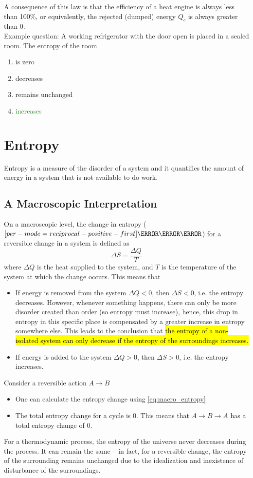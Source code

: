 \documentclass[a4paper,12pt]{article}
\let\oldsection\section
\renewcommand\section{\clearpage\oldsection}
\let\oldsi\si
\renewcommand{\si}[1]{\oldsi[per-mode=reciprocal-positive-first]{#1}}
\newcommand{\lb}{\\[8pt]}
\begin{document}
A consequence of this law is that the efficiency of a heat engine is always less than 100\%, or equivalently, the rejected (dumped) energy $Q_c$ is always greater than 0.\lb
Example question: A working refrigerator with the door open is placed in a sealed room. The entropy of the room
\begin{enumerate}[label=(\Alph*)]
  \item is zero
  \item decreases
  \item remains unchanged
  \item \textcolor{ForestGreen}{increases}
\end{enumerate}

\section{Entropy}

Entropy is a measure of the disorder of a system and it quantifies the amount of energy in a system that is not available to do work.

\subsection{A Macroscopic Interpretation}

On a macroscopic level, the change in entropy ($\si{\joule\per\kelvin}$) for a reversible change in a system is defined as
\begin{equation}\label{eq:macro_entropy}
  \Delta S = \dfrac{\Delta Q}{T}
\end{equation}
where $\Delta Q$ is the heat supplied to the system, and $T$ is the temperature of the system at which the change occurs. This means that
\begin{itemize}
  \item If energy is removed from the system $\Delta Q < 0$, then $\Delta S < 0$, i.e. the entropy decreases. However, whenever something happens, there can only be more disorder created than order (so entropy must increase), hence, this drop in entropy in this specific place is compensated by a greater increase in entropy somewhere else. This leads to the conclusion that \hl{the entropy of a non-isolated system can only decrease if the entropy of the surroundings increases.}
  \item If energy is added to the system $\Delta Q > 0$, then $\Delta S > 0$, i.e. the entropy increases.
\end{itemize}
Consider a reversible action $A \rightarrow B$
\begin{itemize}
  \item One can calculate the entropy change using \cref{eq:macro_entropy}
  \item The total entropy change for a cycle is 0. This means that $A\rightarrow B \rightarrow A$ has a total entropy change of 0.
\end{itemize}
For a thermodynamic process, the entropy of the universe never decreases during the process. It can remain the same -- in fact, for a reversible change, the entropy of the surrounding remains unchanged due to the idealization and inexistence of disturbance of the surroundings.
\end{document}
